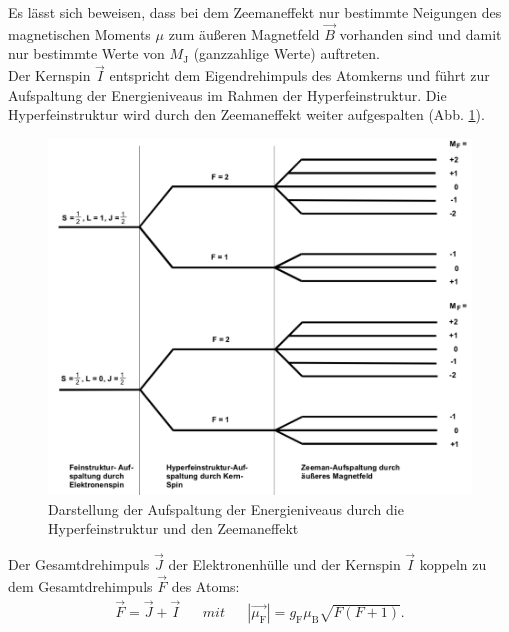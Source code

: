 Es lässt sich beweisen, dass bei dem Zeemaneffekt nur bestimmte Neigungen des magnetischen Moments $\mu$ zum äußeren Magnetfeld $\vec{B}$ vorhanden sind und damit nur bestimmte Werte von $M_{\text{J}}$ (ganzzahlige Werte) auftreten.
%
%
\\Der Kernspin $\vec{I}$ entspricht dem Eigendrehimpuls des Atomkerns und führt zur Aufspaltung der Energieniveaus im Rahmen der Hyperfeinstruktur.
Die Hyperfeinstruktur wird durch den Zeemaneffekt weiter aufgespalten (Abb. \ref{fig:kernspin}).
\begin{figure}[h!]
  \centering
  \includegraphics[width=\textwidth]{kernspin1.png}
  \caption{Darstellung der Aufspaltung der Energieniveaus durch die Hyperfeinstruktur und den Zeemaneffekt \cite{1}}
  \label{fig:kernspin}
\end{figure}
Der Gesamtdrehimpuls $\vec{J}$ der Elektronenhülle und der Kernspin $\vec{I}$ koppeln zu dem Gesamtdrehimpuls $\vec{F}$ des Atoms:
\begin{align*}
  \vec{F}=\vec{J}+\vec{I} && mit && |\vec{\mu_{\text{F}}}|= g_{\text{F}} \mu_{\text{B}} \sqrt{F(F+1)}.\\
\end{align*}
